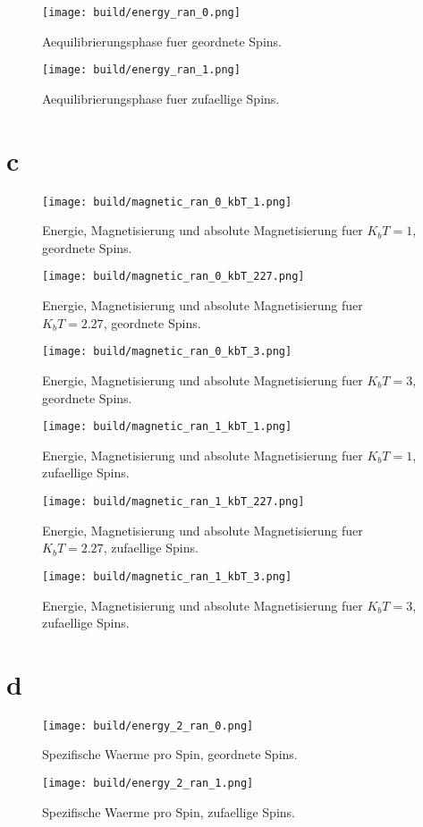 \documentclass{scrartcl}
\begin{document}
\begin{figure}[ht]
  \centering
  \texttt{[image: build/energy\_ran\_0.png]}
  \caption{Aequilibrierungsphase fuer geordnete Spins.}
\end{figure}
\begin{figure}[ht]
  \centering
  \texttt{[image: build/energy\_ran\_1.png]}
  \caption{Aequilibrierungsphase fuer zufaellige Spins.}
\end{figure}
\FloatBarrier
\newpage
\section*{c}
\begin{figure}[ht]
  \centering
  \texttt{[image: build/magnetic\_ran\_0\_kbT\_1.png]}
  \caption{Energie, Magnetisierung und absolute Magnetisierung fuer $K_b T = 1$, geordnete Spins.}
\end{figure}
\begin{figure}[ht]
  \centering
  \texttt{[image: build/magnetic\_ran\_0\_kbT\_227.png]}
  \caption{Energie, Magnetisierung und absolute Magnetisierung fuer $K_b T = 2.27$, geordnete Spins.}
\end{figure}
\begin{figure}[ht]
  \centering
  \texttt{[image: build/magnetic\_ran\_0\_kbT\_3.png]}
  \caption{Energie, Magnetisierung und absolute Magnetisierung fuer $K_b T = 3$, geordnete Spins.}
\end{figure}
\begin{figure}[ht]
  \centering
  \texttt{[image: build/magnetic\_ran\_1\_kbT\_1.png]}
  \caption{Energie, Magnetisierung und absolute Magnetisierung fuer $K_b T = 1$, zufaellige Spins.}
\end{figure}
\begin{figure}[ht]
  \centering
  \texttt{[image: build/magnetic\_ran\_1\_kbT\_227.png]}
  \caption{Energie, Magnetisierung und absolute Magnetisierung fuer $K_b T = 2.27$, zufaellige Spins.}
\end{figure}
\begin{figure}[ht]
  \centering
  \texttt{[image: build/magnetic\_ran\_1\_kbT\_3.png]}
  \caption{Energie, Magnetisierung und absolute Magnetisierung fuer $K_b T = 3$, zufaellige Spins.}
\end{figure}
\FloatBarrier
\newpage
\section*{d}
\begin{figure}[ht]
  \centering
  \texttt{[image: build/energy\_2\_ran\_0.png]}
  \caption{Spezifische Waerme pro Spin, geordnete Spins.}
\end{figure}
\begin{figure}[ht]
  \centering
  \texttt{[image: build/energy\_2\_ran\_1.png]}
  \caption{Spezifische Waerme pro Spin, zufaellige Spins.}
\end{figure}
\FloatBarrier
\newpage
\end{document}
